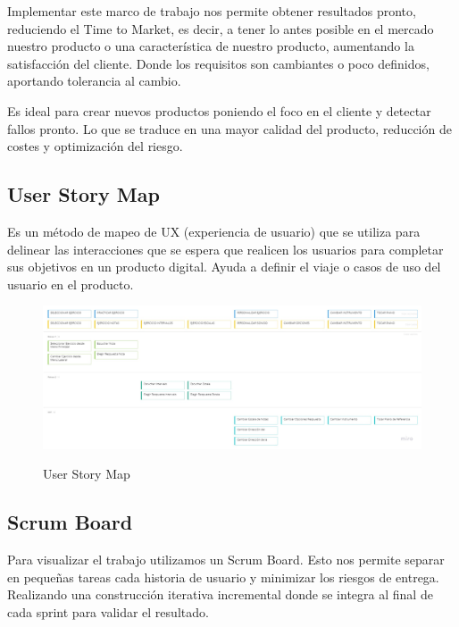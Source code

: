 \documentclass[12pt,twoside,titlepage]{report}
\begin{document}
Implementar este marco de trabajo nos permite obtener resultados pronto, reduciendo el Time to Market, es decir, a tener lo antes posible en el mercado nuestro producto o una característica de nuestro producto, aumentando la satisfacción del cliente. Donde los requisitos son cambiantes o poco definidos, aportando tolerancia al cambio.

Es ideal para crear nuevos productos poniendo el foco en el cliente y detectar fallos pronto. Lo que se traduce en una mayor calidad del producto, reducción de costes y optimización del riesgo.

\subsection{User Story Map}

Es un método de mapeo de UX (experiencia de usuario) que se utiliza para delinear las interacciones que se espera que realicen los usuarios para completar sus objetivos en un producto digital. Ayuda a definir el viaje o casos de uso del usuario en el producto.

\begin{figure}[H]
    \centering
    \includegraphics[scale=0.25]{Scrum/UserStoryMap}
    \label{fig:UserStoryMap}
    \caption{User Story Map}
\end{figure}

\subsection{Scrum Board}

Para visualizar el trabajo utilizamos un Scrum Board. Esto nos permite separar en pequeñas tareas cada historia de usuario y minimizar los riesgos de entrega. Realizando una construcción iterativa incremental donde se integra al final de cada sprint para validar el resultado. 
\end{document}
